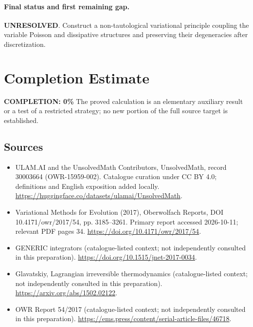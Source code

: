 \documentclass[11pt]{article}
\begin{document}
\paragraph{Final status and first remaining gap.}
\textbf{UNRESOLVED}. Construct a non-tautological variational principle coupling the variable Poisson and dissipative structures and preserving their degeneracies after discretization.

\section{Completion Estimate}
\noindent\textbf{COMPLETION: 0\%}
The proved calculation is an elementary auxiliary result or a test of a restricted strategy; no new portion of the full source target is established.

\subsection{Sources}
\begin{itemize}
\item[\hypertarget{source:30003664:1}{S1}] ULAM.AI and the UnsolvedMath Contributors, UnsolvedMath, record 30003664 (OWR-15959-002). Catalogue curation under CC BY 4.0; definitions and English exposition added locally.
\url{https://huggingface.co/datasets/ulamai/UnsolvedMath}.
\item[\hypertarget{source:30003664:2}{S2}] Variational Methods for Evolution (2017), Oberwolfach Reports, DOI 10.4171/owr/2017/54, pp. 3185--3261. Primary report accessed 2026-10-11; relevant PDF pages 34.
\url{https://doi.org/10.4171/owr/2017/54}.
\item[\hypertarget{source:30003664:3}{S3}] GENERIC integrators (catalogue-listed context; not independently consulted in this preparation).
\url{https://doi.org/10.1515/jnet-2017-0034}.
\item[\hypertarget{source:30003664:4}{S4}] Glavatskiy, Lagrangian irreversible thermodynamics (catalogue-listed context; not independently consulted in this preparation).
\url{https://arxiv.org/abs/1502.02122}.
\item[\hypertarget{source:30003664:5}{S5}] OWR Report 54/2017 (catalogue-listed context; not independently consulted in this preparation).
\url{https://ems.press/content/serial-article-files/46718}.
\end{itemize}
\label{end:30003664}
\end{document}
